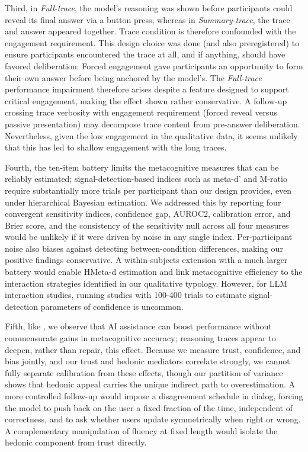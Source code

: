 \documentclass[manuscript,review,anonymous]{acmart}
\begin{document}
Third, in \textit{Full-trace}, the model's reasoning was shown before participants could reveal its final answer via a button press, whereas in \textit{Summary-trace}, the trace and answer appeared together. Trace condition is therefore confounded with the engagement requirement. This design choice was done (and also preregistered) to ensure participants encountered the trace at all, and if anything, should have favored deliberation: Forced engagement gave participants an opportunity to form their own answer before being anchored by the model's. The \textit{Full-trace} performance impairment therefore arises despite a feature designed to support critical engagement, making the effect shown rather conservative. A follow-up crossing trace verbosity with engagement requirement (forced reveal versus passive presentation) may decompose trace content from pre-answer deliberation. Nevertheless, given the low engagement in the qualitative data, it seems unlikely that this has led to shallow engagement with the long traces. 

Fourth, the ten-item battery limits the metacognitive measures that can be reliably estimated; signal-detection-based indices such as meta-d' and M-ratio \cite{rahnev2025comprehensive} require substantially more trials per participant than our design provides, even under hierarchical Bayesian estimation. We addressed this by reporting four convergent sensitivity indices, confidence gap, AUROC2, calibration error, and Brier score, and the consistency of the sensitivity null across all four measures would be unlikely if it were driven by noise in any single index. Per-participant noise also biases against detecting between-condition differences, making our positive findings conservative. A within-subjects extension with a much larger battery would enable HMeta-d estimation and link metacognitive efficiency to the interaction strategies identified in our qualitative typology. However, for LLM interaction studies, running studies with 100-400 trials to estimate signal-detection parameters of confidence is uncommon. 

Fifth, like \citet{FERNANDES2026108779}, we observe that AI assistance can boost performance without commensurate gains in metacognitive accuracy; reasoning traces appear to deepen, rather than repair, this effect. Because we measure trust, confidence, and bias jointly, and our trust and hedonic mediators correlate strongly, we cannot fully separate calibration from these effects, though our partition of variance shows that hedonic appeal carries the unique indirect path to overestimation. A more controlled follow-up would impose a disagreement schedule in dialog, forcing the model to push back on the user a fixed fraction of the time, independent of correctness, and to ask whether users update symmetrically when right or wrong. A complementary manipulation of fluency at fixed length would isolate the hedonic component from trust directly.
\end{document}
